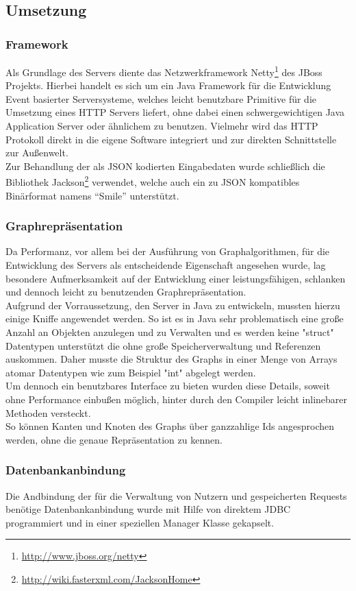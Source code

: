 \subsection*{Umsetzung}
\subsubsection*{Framework}
Als Grundlage des Servers diente das Netzwerkframework Netty\footnote{\url{http://www.jboss.org/netty}} des JBoss Projekts. Hierbei handelt es sich um ein Java Framework für die Entwicklung Event basierter Serversysteme, welches leicht benutzbare Primitive für die Umsetzung eines HTTP Servers liefert, ohne dabei einen schwergewichtigen Java Application Server oder ähnlichem zu benutzen. Vielmehr wird das HTTP Protokoll direkt in die eigene Software integriert und zur direkten Schnittstelle zur Außenwelt.\\
Zur Behandlung der als JSON kodierten Eingabedaten wurde schließlich die Bibliothek Jackson\footnote{\url{http://wiki.fasterxml.com/JacksonHome}} verwendet, welche auch ein zu JSON kompatibles Binärformat namens ``Smile'' unterstützt.
\subsubsection*{Graphrepräsentation}
Da Performanz, vor allem bei der Ausführung von Graphalgorithmen, für die Entwicklung des Servers als entscheidende Eigenschaft angesehen wurde, lag besondere Aufmerksamkeit auf der Entwicklung einer leistungsfähigen, schlanken und dennoch leicht zu benutzenden Graphrepräsentation.\\
Aufgrund der Vorraussetzung, den Server in Java zu entwickeln, mussten hierzu einige Kniffe angewendet werden.
So ist es in Java sehr problematisch eine große Anzahl an Objekten anzulegen und zu Verwalten und es werden keine "struct" Datentypen unterstützt die ohne große Speicherverwaltung und Referenzen auskommen.
Daher musste die Struktur des Graphs in einer Menge von Arrays atomar Datentypen wie zum Beispiel "int" abgelegt werden.\\
Um dennoch ein benutzbares Interface zu bieten wurden diese Details, soweit ohne Performance einbußen möglich,  hinter durch den Compiler leicht inlinebarer Methoden versteckt.\\
So können Kanten und Knoten des Graphs über ganzzahlige Ids angesprochen werden, ohne die genaue Repräsentation zu kennen.
\subsubsection*{Datenbankanbindung}
Die Andbindung der für die Verwaltung von Nutzern und gespeicherten Requests benötige Datenbankanbindung wurde mit Hilfe von direktem JDBC programmiert und in einer speziellen Manager Klasse gekapselt.
